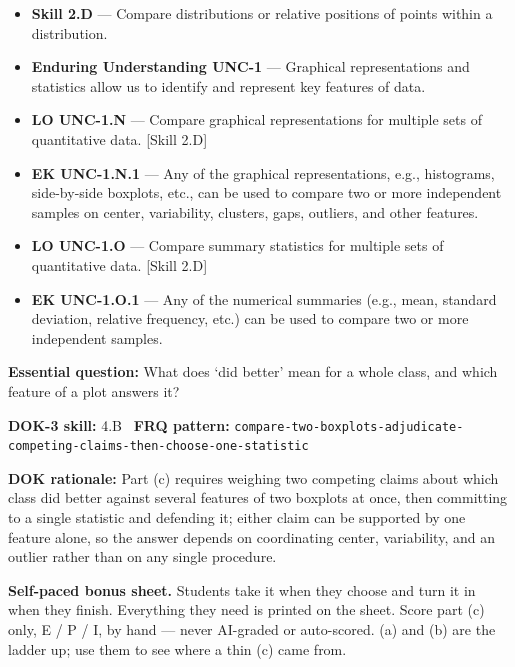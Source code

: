 \documentclass[11pt]{article}
\begin{document}


{\small
\begin{itemize}[leftmargin=1.5em,itemsep=2pt,topsep=2pt]
  \item \textbf{Skill 2.D} --- Compare distributions or relative positions of points within a distribution.
  \item \textbf{Enduring Understanding UNC-1} --- Graphical representations and statistics allow us to identify and represent key features of data.
  \item \textbf{LO UNC-1.N} --- Compare graphical representations for multiple sets of quantitative data. [Skill 2.D]
  \item \textbf{EK UNC-1.N.1} --- Any of the graphical representations, e.g., histograms, side-by-side boxplots, etc., can be used to compare two or more independent samples on center, variability, clusters, gaps, outliers, and other features.
  \item \textbf{LO UNC-1.O} --- Compare summary statistics for multiple sets of quantitative data. [Skill 2.D]
  \item \textbf{EK UNC-1.O.1} --- Any of the numerical summaries (e.g., mean, standard deviation, relative frequency, etc.) can be used to compare two or more independent samples.
\end{itemize}
}
\textbf{Essential question:} What does `did better' mean for a whole class, and which feature of a plot answers it?\par
\textbf{DOK-3 skill:} 4.B \textperiodcentered\ \textbf{FRQ pattern:} {\small\texttt{compare-\allowbreak{}two-\allowbreak{}boxplots-\allowbreak{}adjudicate-\allowbreak{}competing-\allowbreak{}claims-\allowbreak{}then-\allowbreak{}choose-\allowbreak{}one-\allowbreak{}statistic}}\par
\textbf{DOK rationale:} Part (c) requires weighing two competing claims about which class did better against several features of two boxplots at once, then committing to a single statistic and defending it; either claim can be supported by one feature alone, so the answer depends on coordinating center, variability, and an outlier rather than on any single procedure.\par

\textbf{Self-paced bonus sheet.} Students take it when they choose and turn it in when they finish. Everything they need is printed on the sheet. Score part (c) only, E / P / I, by hand --- never AI-graded or auto-scored. (a) and (b) are the ladder up; use them to see where a thin (c) came from.\par
\end{document}
